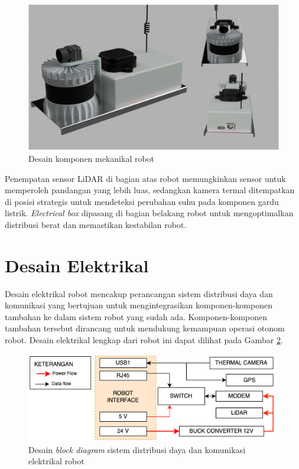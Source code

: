 \begin{figure}[H]
  \centering
  \includegraphics[scale=0.11]{gambar/mechanical_design.png}
  \caption{Desain komponen mekanikal robot}
  \label{fig:DesignMekanikalRobot}
\end{figure}

Penempatan sensor LiDAR di bagian atas robot memungkinkan sensor untuk memperoleh pandangan yang lebih luas, sedangkan kamera termal ditempatkan di posisi strategis untuk mendeteksi perubahan suhu pada komponen gardu listrik. \emph{Electrical box} dipasang di bagian belakang robot untuk mengoptimalkan distribusi berat dan memastikan kestabilan robot.

\section{Desain Elektrikal}

Desain elektrikal robot mencakup perancangan sistem distribusi daya dan komunikasi yang bertujuan untuk mengintegrasikan komponen-komponen tambahan ke dalam sistem robot yang sudah ada. Komponen-komponen tambahan tersebut dirancang untuk mendukung kemampuan operasi otonom robot. Desain elektrikal lengkap dari robot ini dapat dilihat pada Gambar \ref{fig:Desain electrical robot}.

\begin{figure}[H] \centering
  \includegraphics[scale=0.72]{gambar/electrical.png} \caption{Desain \emph{block diagram} sistem distribusi daya dan komunikasi elektrikal robot} 
   \label{fig:Desain electrical robot} 
\end{figure}

